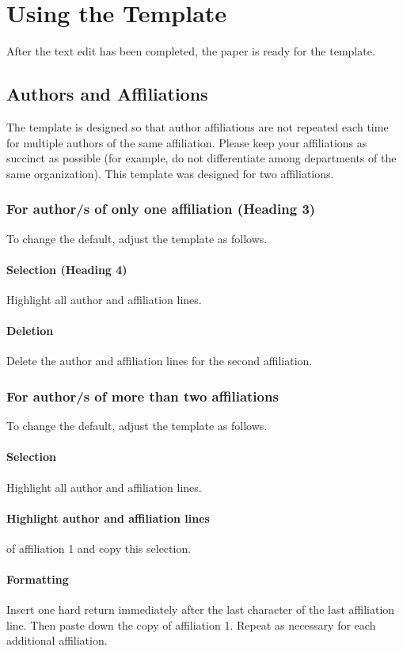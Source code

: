 \documentclass[conference, letterpaper]{IEEEtran}
\begin{document}
\section{Using the Template}
After the text edit has been completed, the paper is ready for the template.
\subsection{Authors and Affiliations}
The template is designed so that author affiliations are not repeated each time for multiple authors of the same affiliation. Please keep your affiliations as succinct as possible (for example, do not differentiate among departments of the same organization). This template was designed for two affiliations.
\subsubsection{For author/s of only one affiliation (Heading 3)} To change the default, adjust the template as follows.
\paragraph{Selection (Heading 4)} Highlight all author and affiliation lines.
\paragraph{Deletion} Delete the author and affiliation lines for the second affiliation.
\subsubsection{For author/s of more than two affiliations} To change the default, adjust the template as follows.
\paragraph{Selection} Highlight all author and affiliation lines.
\paragraph{Highlight author and affiliation lines} of affiliation 1 and copy this selection.
\paragraph{Formatting} Insert one hard return immediately after the last character of the last affiliation line. Then paste down the copy of affiliation 1. Repeat as necessary for each additional affiliation.
\end{document}
